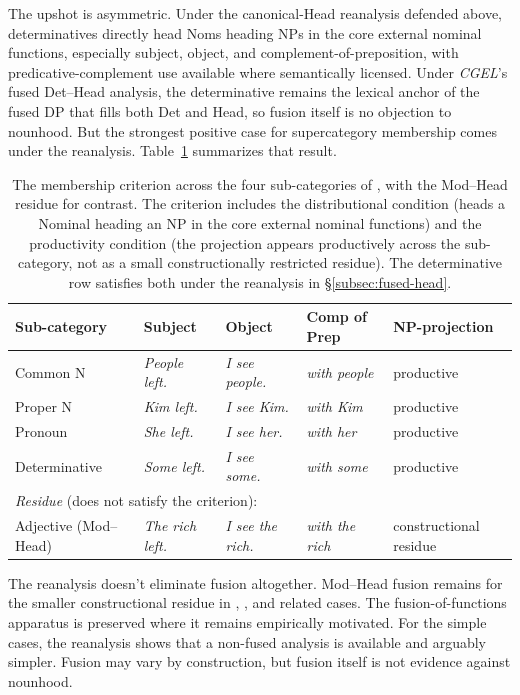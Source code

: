 \documentclass[12pt]{article}
\begin{document}
The upshot is asymmetric. Under the canonical-Head reanalysis defended above, determinatives directly head Noms heading NPs in the core external nominal functions, especially subject, object, and complement-of-preposition, with predicative-complement use available where semantically licensed. Under \textit{CGEL}'s fused Det--Head analysis, the determinative remains the lexical anchor of the fused DP that fills both Det and Head, so fusion itself is no objection to nounhood. But the strongest positive case for supercategory membership comes under the reanalysis. Table~\ref{tab:diagnostic} summarizes that result.

\begin{table}[h]
\centering
\caption{The membership criterion across the four sub-categories of , with the Mod--Head residue for contrast. The criterion includes the distributional condition (heads a Nominal heading an NP in the core external nominal functions) and the productivity condition (the projection appears productively across the sub-category, not as a small constructionally restricted residue). The determinative row satisfies both under the reanalysis in §\ref{subsec:fused-head}.}\label{tab:diagnostic}
\begin{tabular}{lllll}
\hline
Sub-category & Subject & Object & Comp of Prep & NP-projection \\
\hline
Common N & \textit{People left.} & \textit{I see people.} & \textit{with people} & productive \\
Proper N & \textit{Kim left.} & \textit{I see Kim.} & \textit{with Kim} & productive \\
Pronoun & \textit{She left.} & \textit{I see her.} & \textit{with her} & productive \\
Determinative & \textit{Some left.} & \textit{I see some.} & \textit{with some} & productive \\
\hline
\multicolumn{5}{l}{\emph{Residue} (does not satisfy the criterion):} \\
Adjective (Mod--Head) & \textit{The rich left.} & \textit{I see the rich.} & \textit{with the rich} & constructional residue \\
\hline
\end{tabular}
\end{table}

The reanalysis doesn't eliminate fusion altogether. Mod--Head fusion remains for the smaller constructional residue in , , and related cases. The fusion-of-functions apparatus is preserved where it remains empirically motivated. For the simple cases, the reanalysis shows that a non-fused analysis is available and arguably simpler. Fusion may vary by construction, but fusion itself is not evidence against nounhood.
\end{document}
